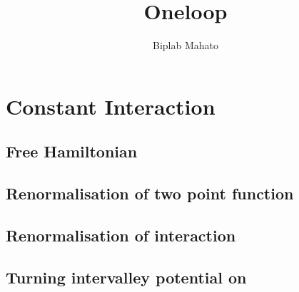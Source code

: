 \documentclass[a4paper]{article}
\title{
	Oneloop
}
\author{Biplab Mahato}
\begin{document}
    
    \tableofcontents
    
    \section{Constant Interaction}
    \subsection{Free Hamiltonian}
        
    \subsection{Renormalisation of two point function}
        
    \subsection{Renormalisation of interaction}
        
    \subsection{Turning intervalley potential on}
        
\end{document}
